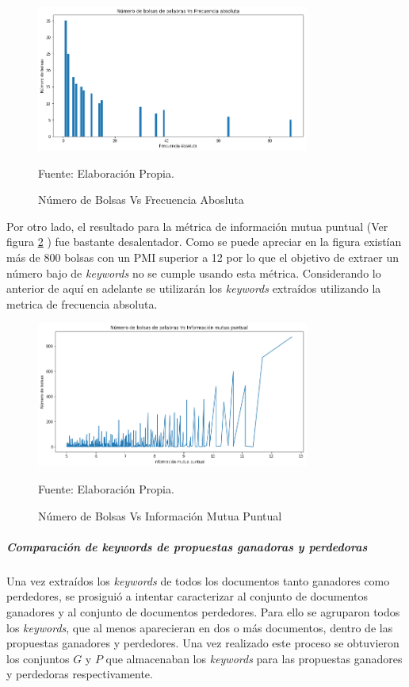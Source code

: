     \begin{figure}[H]
    \centering
    \includegraphics[width=0.8\textwidth]{figures/KeyWords/Umbral_FA.png}
    \caption{\label{fig:BowVsFA} Número de Bolsas Vs Frecuencia Abosluta} Fuente: Elaboración Propia.
    \end{figure}
    
    Por otro lado, el resultado para la métrica de información mutua puntual (Ver figura \ref{fig:BowVsPMI} ) fue bastante desalentador. Como se puede apreciar en la figura existían más de 800 bolsas con un PMI superior a 12 por lo que el objetivo de extraer un número bajo de \textit{keywords} no se cumple usando esta métrica. 
    Considerando lo anterior de aquí en adelante se utilizarán los \textit{keywords} extraídos utilizando la metrica de frecuencia absoluta. 
    
    \begin{figure}[H]
    \centering
    \includegraphics[width=0.8\textwidth]{figures/KeyWords/Umbral_PMI.png}
    \caption{\label{fig:BowVsPMI} Número de Bolsas Vs Información  Mutua Puntual} Fuente: Elaboración Propia.
    \end{figure}

\subparagraph{Comparación de keywords de propuestas ganadoras y perdedoras}
\subparagraph*{}
    Una vez extraídos los \textit{keywords} de todos los documentos tanto ganadores como perdedores, se prosiguió a intentar caracterizar al conjunto de documentos ganadores y al conjunto de documentos perdedores. Para ello se agruparon todos los \textit{keywords}, que al menos aparecieran en dos o más documentos, dentro de las propuestas ganadores y perdedores. Una vez realizado este proceso se obtuvieron los conjuntos $G$ y $P$ que almacenaban los \textit{keywords} para las propuestas ganadores y perdedoras respectivamente. 
    

